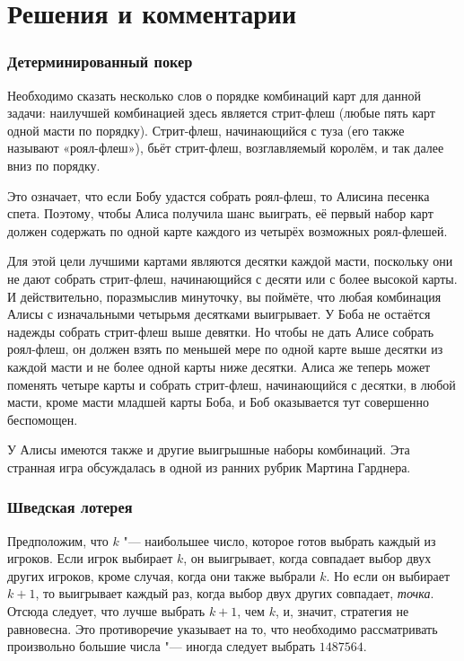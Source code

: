 \documentclass[twoside]{book}
\begin{document}

\section*{Решения и комментарии}

\subsubsection*{Детерминированный покер}%

Необходимо сказать несколько слов о порядке комбинаций карт для данной задачи: наилучшей комбинацией здесь является стрит-флеш (любые пять карт одной масти по порядку).
Стрит-флеш, начинающийся с туза (его также называют «роял-флеш»), бьёт стрит-флеш, возглавляемый королём, и так далее вниз по порядку.

Это означает, что если Бобу удастся собрать роял-флеш, то Алисина песенка спета.
Поэтому, чтобы Алиса получила шанс выиграть, её первый набор карт должен содержать по одной карте каждого из четырёх возможных роял-флешей.

Для этой цели лучшими картами являются десятки каждой масти, поскольку они не дают собрать стрит-флеш, начинающийся с десяти или с более высокой карты.
И действительно, поразмыслив минуточку, вы поймёте, что любая комбинация Алисы с изначальными четырьмя десятками выигрывает.
У Боба не остаётся надежды собрать стрит-флеш выше девятки.
Но чтобы не дать Алисе собрать роял-флеш, он должен взять по меньшей мере по одной карте выше десятки из каждой масти и не более одной карты ниже десятки.
Алиса же теперь может поменять четыре карты и собрать стрит-флеш, начинающийся с десятки, в любой масти, кроме масти младшей карты Боба,
и Боб оказывается тут совершенно беспомощен.
\heart

У Алисы имеются также и другие выигрышные наборы комбинаций.
Эта странная игра обсуждалась в одной из ранних рубрик Мартина Гарднера. 

\subsubsection*{Шведская лотерея}%

Предположим, что $k$ "--- наибольшее число, которое готов выбрать каждый из игроков.
Если игрок выбирает $k$, он выигрывает, когда совпадает выбор двух других игроков, кроме случая, когда они также выбрали $k$.
Но если он выбирает $k+1$, то выигрывает каждый раз, когда выбор двух других совпадает, \emph{точка}.
Отсюда следует, что лучше выбрать $k+1$, чем $k$, и, значит, стратегия не равновесна.
Это противоречие указывает на то, что необходимо рассматривать произвольно большие числа "--- иногда следует выбрать $1487564$.
\heart
\end{document}

